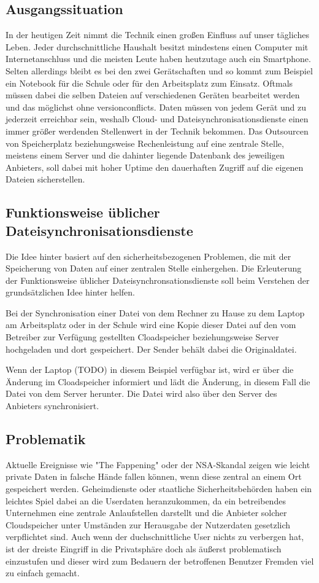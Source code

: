 \subsection{Ausgangssituation}
In der heutigen Zeit nimmt die Technik einen großen Einfluss auf unser tägliches
Leben. Jeder durchschnittliche Haushalt besitzt mindestens einen Computer mit
Internetanschluss und die meisten Leute haben heutzutage auch ein Smartphone.
Selten allerdings bleibt es bei den zwei Gerätschaften und so kommt zum Beispiel
ein Notebook für die Schule oder für den Arbeitsplatz zum Einsatz. Oftmals
müssen dabei die selben Dateien auf verschiedenen Geräten bearbeitet werden und
das möglichst ohne \glspl{versionconflict}. Daten müssen von jedem
Gerät und zu jederzeit erreichbar sein, weshalb Cloud- und
Dateisynchronisationsdienste einen immer größer werdenden Stellenwert in der
Technik bekommen.
Das Outsourcen von Speicherplatz beziehungsweise Rechenleistung auf eine
zentrale Stelle, meistens einem Server und die dahinter liegende Datenbank des
jeweiligen Anbieters, soll dabei mit hoher Uptime den dauerhaften Zugriff auf
die eigenen Dateien sicherstellen.

\subsection{Funktionsweise üblicher Dateisynchronisationsdienste}
Die Idee hinter \sblit basiert auf den sicherheitsbezogenen Problemen, die mit
der Speicherung von Daten auf einer zentralen Stelle einhergehen. Die
Erleuterung der Funktionsweise üblicher Dateisynchronsationsdienste soll beim
Verstehen der grundsätzlichen Idee hinter \sblit helfen.

Bei der Synchronisation einer Datei von dem Rechner zu Hause zu dem Laptop am
Arbeitsplatz oder in der Schule wird eine Kopie dieser Datei auf den vom
Betreiber zur Verfügung gestellten Cloadspeicher beziehungsweise Server
hochgeladen und dort gespeichert. Der Sender behält dabei die Originaldatei.

Wenn der Laptop (TODO) in diesem Beispiel verfügbar ist, wird er über die Änderung
im Cloadspeicher informiert und lädt die Änderung, in diesem Fall die Datei von
dem Server herunter. Die Datei wird also über den Server des Anbieters
synchronisiert.

\subsection{Problematik}
Aktuelle Ereignisse wie "The Fappening" oder der NSA-Skandal zeigen wie leicht
private Daten in falsche Hände fallen können, wenn diese zentral an einem Ort
gespeichert werden. Geheimdienste oder staatliche Sicherheitsbehörden haben
ein leichtes Spiel dabei an die Userdaten heranzukommen, da ein betreibendes
Unternehmen eine zentrale Anlaufstellen darstellt und die Anbieter solcher
Cloudspeicher unter Umständen zur Herausgabe der Nutzerdaten gesetzlich
verpflichtet sind. Auch wenn der duchschnittliche User nichts zu verbergen hat,
ist der dreiste Eingriff in die Privatsphäre doch als äußerst problematisch
einzustufen und dieser wird zum Bedauern der betroffenen Benutzer Fremden viel
zu einfach gemacht.

